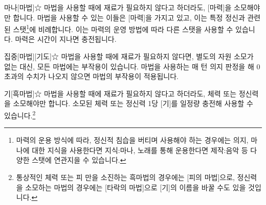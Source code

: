 \documentclass{report}
\begin{document}
	\begin{story}{마나}{[마법]☆}
		마법을 사용할 때에 재료가 필요하지 않다고 하더라도, [마력]을 소모해야만 합니다. 마법을 사용할 수 있는 이들은 [마력]을 가지고 있고, 이는 특정 정신과 관련된 스탯\footnote{마력의 운용 방식에 따라, 정신적 침습을 버티며 사용해야 하는 경우에는 의지, 마나에 대한 지식을 사용한다면 지식:마나, 노래를 통해 운용한다면 제작:음악 등 다양한 스탯에 연관지을 수 있습니다.}에 비례합니다. 이는 마력의 운영 방법에 따라 다른 스탯을 사용할 수 있습니다. 마력은 시간이 지나면 충전됩니다.
	\end{story}

	\begin{story}{집중}{[마법][기도]☆}
		마법을 사용할 때에 재료가 필요하지 않다면, 별도의 자원 소모가 없는 대신, 모든 마법에는 부작용이 있습니다. 마법을 사용하는 매 턴 의지 판정을 해 0 초과의 수치가 나오지 않으면 마법의 부작용이 적용됩니다.
	\end{story}
	
	\begin{story}{기}{[흑마법]☆}
		마법을 사용할 때에 재료가 필요하지 않다고 하더라도, 체력 또는 정신력을 소모해야만 합니다. 소모된 체력 또는 정신력 1당 [기]를 일정량 충전해 사용할 수 있습니다.\footnote{통상적인 체력 또는 피 만을 소진하는 흑마법의 경우에는 [피의 마법]으로, 정신력을 소모하는 마법의 경우에는 [타락의 마법]으로 [기]의 이름을 바꿀 수도 있을 것입니다.}
	\end{story}
\end{document}
